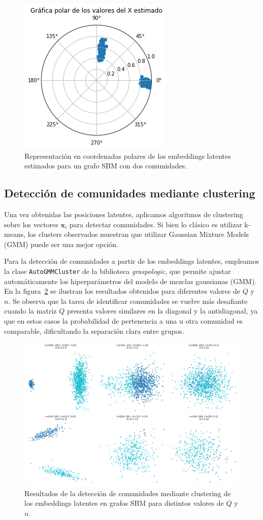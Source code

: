\documentclass{article}
\begin{document}
\begin{figure}[htb]
    \centering
    \includegraphics[width=0.4\linewidth]{images/coordenadas_polares.png}
    \caption{Representación en coordenadas polares de los embeddings latentes estimados para un grafo SBM con dos comunidades.}
    \label{fig:coordenadas polares}
\end{figure}

\subsection{Detección de comunidades mediante clustering}

Una vez obtenidas las posiciones latentes, aplicamos algoritmos de clustering sobre los vectores $\mathbf{x}_i$ para detectar comunidades. Si bien lo clásico es utilizar k-means, los clusters observados muestran que utilizar Gaussian Mixture Models (GMM) puede ser una mejor opción.

Para la detección de comunidades a partir de los embeddings latentes, empleamos la clase \verb|AutoGMMCluster| de la biblioteca \textit{graspologic}, que permite ajustar automáticamente los hiperparámetros del modelo de mezclas gaussianas (GMM). En la figura~\ref{fig:comunidades} se ilustran los resultados obtenidos para diferentes valores de $Q$ y $n$. Se observa que la tarea de identificar comunidades se vuelve más desafiante cuando la matriz $Q$ presenta valores similares en la diagonal y la antidiagonal, ya que en estos casos la probabilidad de pertenencia a una u otra comunidad es comparable, dificultando la separación clara entre grupos.

\begin{figure}[htb]
    \centering
    \includegraphics[width=0.7\linewidth]{images/comunidades.png}
    \caption{ Resultados de la detección de comunidades mediante clustering de los embeddings latentes en grafos SBM para distintos valores de $Q$ y $n$.}
    \label{fig:comunidades}
\end{figure}
\end{document}
